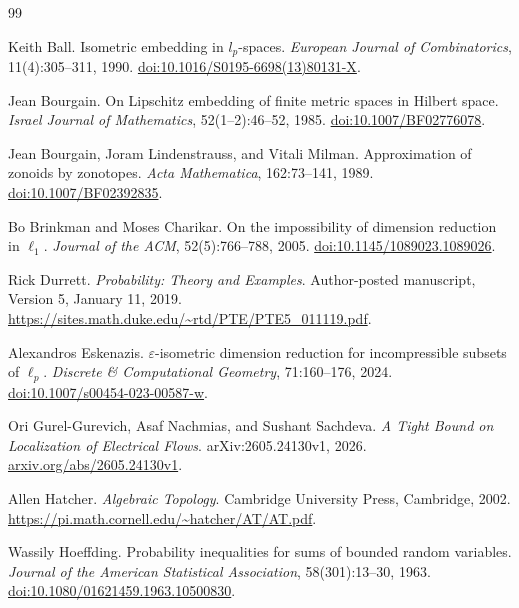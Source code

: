 \documentclass[11pt]{article}
\theoremstyle{remark}
\numberwithin{equation}{section}
\begin{document}
\begin{thebibliography}{99}
Keith Ball.
\newblock Isometric embedding in $l_p$-spaces.
\newblock \emph{European Journal of Combinatorics}, 11(4):305--311, 1990.
\newblock \href{https://doi.org/10.1016/S0195-6698(13)80131-X}
{doi:10.1016/S0195-6698(13)80131-X}.

Jean Bourgain.
\newblock On Lipschitz embedding of finite metric spaces in Hilbert space.
\newblock \emph{Israel Journal of Mathematics}, 52(1--2):46--52, 1985.
\newblock \href{https://doi.org/10.1007/BF02776078}{doi:10.1007/BF02776078}.

Jean Bourgain, Joram Lindenstrauss, and Vitali Milman.
\newblock Approximation of zonoids by zonotopes.
\newblock \emph{Acta Mathematica}, 162:73--141, 1989.
\newblock \href{https://doi.org/10.1007/BF02392835}{doi:10.1007/BF02392835}.

Bo Brinkman and Moses Charikar.
\newblock On the impossibility of dimension reduction in $\ell_1$.
\newblock \emph{Journal of the ACM}, 52(5):766--788, 2005.
\newblock \href{https://doi.org/10.1145/1089023.1089026}
{doi:10.1145/1089023.1089026}.

Rick Durrett.
\newblock \emph{Probability: Theory and Examples}.
\newblock Author-posted manuscript, Version 5, January 11, 2019.
\newblock \url{https://sites.math.duke.edu/~rtd/PTE/PTE5_011119.pdf}.

Alexandros Eskenazis.
\newblock $\varepsilon$-isometric dimension reduction for incompressible
subsets of $\ell_p$.
\newblock \emph{Discrete \& Computational Geometry}, 71:160--176, 2024.
\newblock \href{https://doi.org/10.1007/s00454-023-00587-w}
{doi:10.1007/s00454-023-00587-w}.

Ori Gurel-Gurevich, Asaf Nachmias, and Sushant Sachdeva.
\newblock \emph{A Tight Bound on Localization of Electrical Flows}.
\newblock arXiv:2605.24130v1, 2026.
\newblock \href{https://arxiv.org/abs/2605.24130v1}{arxiv.org/abs/2605.24130v1}.

Allen Hatcher.
\newblock \emph{Algebraic Topology}.
\newblock Cambridge University Press, Cambridge, 2002.
\newblock \url{https://pi.math.cornell.edu/~hatcher/AT/AT.pdf}.

Wassily Hoeffding.
\newblock Probability inequalities for sums of bounded random variables.
\newblock \emph{Journal of the American Statistical Association},
58(301):13--30, 1963.
\newblock \href{https://doi.org/10.1080/01621459.1963.10500830}
{doi:10.1080/01621459.1963.10500830}.


\end{thebibliography}
\end{document}
